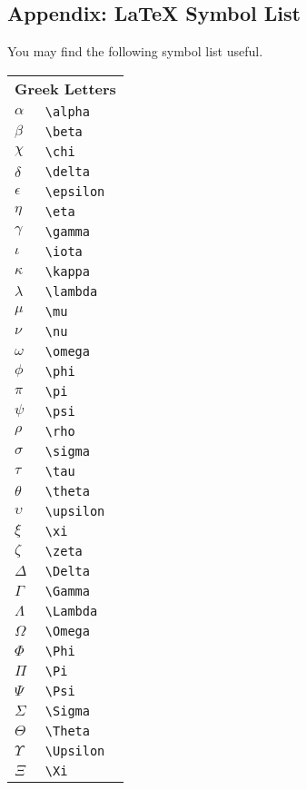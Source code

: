 \documentclass[12pt,a4paper]{article}
\begin{document}
\subsection*{Appendix: \LaTeX \hspace{0.1em} Symbol List}
You may find the following symbol list useful. \\
\begin{tabular}[t]{ll}
\multicolumn{2}{l}{\textbf{Greek Letters}} \\
$\alpha$ & \verb$\alpha$ \\
$\beta$ & \verb$\beta$ \\
$\chi$ & \verb$\chi$ \\
$\delta$ & \verb$\delta$ \\
$\epsilon$ & \verb$\epsilon$ \\
$\eta$ & \verb$\eta$ \\
$\gamma$ & \verb$\gamma$ \\
$\iota$ & \verb$\iota$ \\
$\kappa$ & \verb$\kappa$ \\
$\lambda$ & \verb$\lambda$ \\
$\mu$ & \verb$\mu$ \\
$\nu$ & \verb$\nu$ \\
$\omega$ & \verb$\omega$ \\
$\phi$ & \verb$\phi$ \\
$\pi$ & \verb$\pi$ \\
$\psi$ & \verb$\psi$ \\
$\rho$ & \verb$\rho$ \\
$\sigma$ & \verb$\sigma$ \\
$\tau$ & \verb$\tau$ \\
$\theta$ & \verb$\theta$ \\
$\upsilon$ & \verb$\upsilon$ \\
$\xi$ & \verb$\xi$ \\
$\zeta$ & \verb$\zeta$ \\
$\Delta$ & \verb$\Delta$ \\
$\Gamma$ & \verb$\Gamma$ \\
$\Lambda$ & \verb$\Lambda$ \\
$\Omega$ & \verb$\Omega$ \\
$\Phi$ & \verb$\Phi$ \\
$\Pi$ & \verb$\Pi$ \\
$\Psi$ & \verb$\Psi$ \\
$\Sigma$ & \verb$\Sigma$ \\
$\Theta$ & \verb$\Theta$ \\
$\Upsilon$ & \verb$\Upsilon$ \\
$\Xi$ & \verb$\Xi$ \\
\end{tabular}
\end{document}
